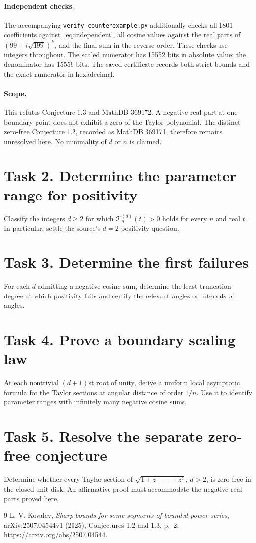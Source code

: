 \documentclass[11pt]{article}
\begin{document}
\paragraph{Independent checks.}
The accompanying \texttt{verify\_counterexample.py} additionally checks
all 1801 coefficients against~\eqref{eq:independent}, all cosine values
against the real parts of $(99+i\sqrt{199})^k$, and the final sum in the
reverse order. These checks use integers throughout. The scaled numerator
has 15552 bits in absolute value; the denominator has 15559 bits.
The saved certificate records both strict bounds and the exact numerator
in hexadecimal.

\paragraph{Scope.}
This refutes Conjecture 1.3 and MathDB 369172. A negative real part at
one boundary point does not exhibit a zero of the Taylor polynomial.
The distinct zero-free Conjecture 1.2, recorded as MathDB 369171,
therefore remains unresolved here. No minimality of $d$ or $n$ is claimed.

\section*{Task 2. Determine the parameter range for positivity}
Classify the integers $d\geq2$ for which
$\mathcal T_n^{(d)}(t)>0$ holds for every $n$ and real $t$.
In particular, settle the source's $d=2$ positivity question.

\section*{Task 3. Determine the first failures}
For each $d$ admitting a negative cosine sum, determine the least
truncation degree at which positivity fails and certify the relevant
angles or intervals of angles.

\section*{Task 4. Prove a boundary scaling law}
At each nontrivial $(d+1)$st root of unity, derive a uniform local
asymptotic formula for the Taylor sections at angular distance of
order $1/n$. Use it to identify parameter ranges with infinitely many
negative cosine sums.

\section*{Task 5. Resolve the separate zero-free conjecture}
Determine whether every Taylor section of
$\sqrt{1+z+\cdots+z^d}$, $d>2$, is zero-free in the closed unit disk.
An affirmative proof must accommodate the negative real parts proved here.

\begin{thebibliography}{9}
L. V. Kovalev,
\emph{Sharp bounds for some segments of bounded power series},
arXiv:2507.04544v1 (2025), Conjectures 1.2 and 1.3, p.~2.
\url{https://arxiv.org/abs/2507.04544}.
\end{thebibliography}
\end{document}
